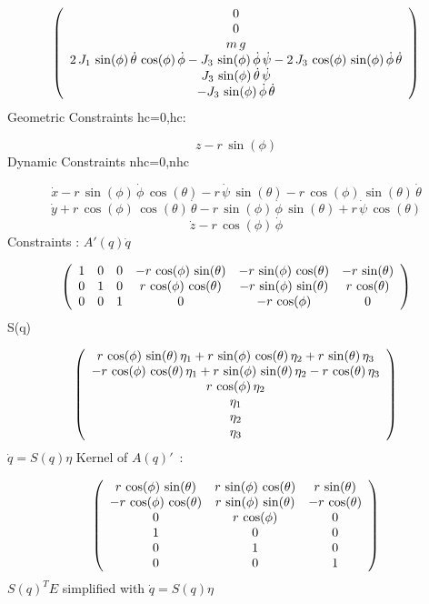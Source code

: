 $$ \left( \begin{array}{c} 0 \cr 0 \cr m\,g \cr 2\,J_{1}\,\sin(\phi)\,
\dot{\theta}\,\cos(\phi)\,\dot{\phi}-J_{3}\,\sin(\phi)\,\dot{\phi}\,
\dot{\psi}-2\,J_{3}\,\cos(\phi)\,\sin(\phi)\,\dot{\phi}\,\dot{\theta}
 \cr J_{3}\,\sin(\phi)\,\dot{\theta}\,\dot{\psi} \cr -J_{3}\,\sin(\phi
)\,\dot{\phi}\,\dot{\theta} \end{array} \right) $$
Geometric Constraints hc=0,hc:
 
\[ z - r\,\sin(\phi) \]
Dynamic Constraints nhc=0,nhc
 
\[ \dot{x} - r\,\sin(\phi)\,\dot{\phi}\,\cos(\theta) - r\,\dot{\psi}\,
\sin(\theta) - r\,\cos(\phi)\,\sin(\theta)\,\dot{\theta} \]
\[ \dot{y} + r\,\cos(\phi)\,\cos(\theta)\,\dot{\theta} - r\,\sin(\phi)
\,\dot{\phi}\,\sin(\theta) + r\,\dot{\psi}\,\cos(\theta) \]
\[ \dot{z} - r\,\cos(\phi)\,\dot{\phi} \]
Constraints : $A'(q)\dot{q}$
 
$$ \left( \begin{array}{cccccc} 1 & 0 & 0 & -r\,\cos(\phi)\,\sin(
\theta) & -r\,\sin(\phi)\,\cos(\theta) & -r\,\sin(\theta) \cr 0 & 1 & 
0 & r\,\cos(\phi)\,\cos(\theta) & -r\,\sin(\phi)\,\sin(\theta) & r\,
\cos(\theta) \cr 0 & 0 & 1 & 0 & -r\,\cos(\phi) & 0
 \end{array} \right) $$
 S(q)
 
$$ \left( \begin{array}{c} r\,\cos(\phi)\,\sin(\theta)\,\eta_1+r\,\sin
(\phi)\,\cos(\theta)\,\eta_2+r\,\sin(\theta)\,\eta_3 \cr -r\,\cos(\phi
)\,\cos(\theta)\,\eta_1+r\,\sin(\phi)\,\sin(\theta)\,\eta_2-r\,\cos(
\theta)\,\eta_3 \cr r\,\cos(\phi)\,\eta_2 \cr \eta_1 \cr \eta_2 \cr 
\eta_3 \end{array} \right) $$
$\dot{q}=S(q)\eta$ Kernel of $A(q)'$~:
 
$$ \left( \begin{array}{ccc} r\,\cos(\phi)\,\sin(\theta) & r\,\sin(
\phi)\,\cos(\theta) & r\,\sin(\theta) \cr -r\,\cos(\phi)\,\cos(\theta)
 & r\,\sin(\phi)\,\sin(\theta) & -r\,\cos(\theta) \cr 0 & r\,\cos(\phi
) & 0 \cr 1 & 0 & 0 \cr 0 & 1 & 0 \cr 0 & 0 & 1 \end{array} \right) $$
$S(q)^T E$ simplified with $\dot{q}=S(q)\eta $
 

